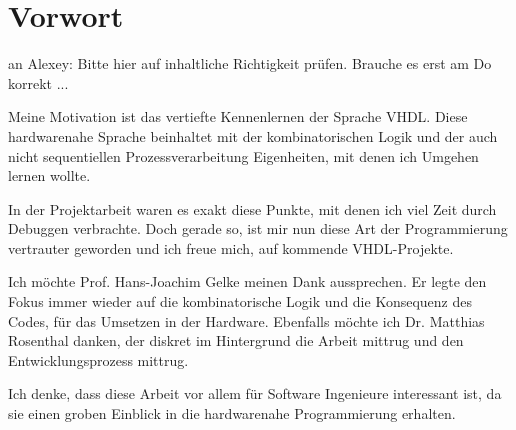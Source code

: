 
\chapter*{Vorwort}\label{chap.vorwort}
an Alexey: Bitte hier auf inhaltliche Richtigkeit prüfen. Brauche es erst am Do
korrekt ...

Meine Motivation ist das vertiefte Kennenlernen der Sprache VHDL. Diese hardwarenahe Sprache beinhaltet mit der kombinatorischen Logik und der auch nicht sequentiellen Prozessverarbeitung Eigenheiten, mit denen ich Umgehen lernen wollte.

In der Projektarbeit waren es exakt diese Punkte, mit denen ich viel Zeit durch Debuggen verbrachte. Doch gerade so, ist mir nun diese Art der Programmierung vertrauter geworden und ich freue mich, auf kommende VHDL-Projekte.

Ich möchte Prof. Hans-Joachim Gelke meinen Dank aussprechen. Er legte den Fokus immer wieder auf die kombinatorische Logik und die Konsequenz des Codes, für das Umsetzen in der Hardware. Ebenfalls möchte ich Dr. Matthias Rosenthal danken, der diskret im Hintergrund die Arbeit mittrug und den Entwicklungsprozess mittrug.

Ich denke, dass diese Arbeit vor allem für Software Ingenieure interessant ist, da sie einen groben Einblick in die hardwarenahe Programmierung erhalten.



